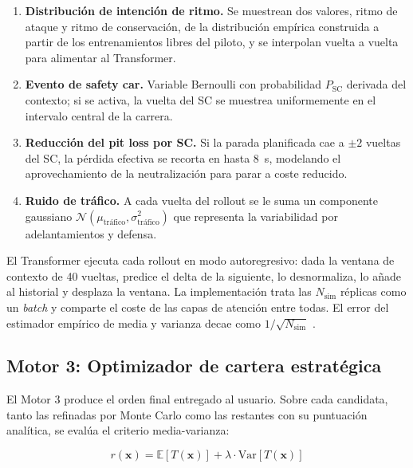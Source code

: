 \begin{enumerate}
    \item \textbf{Distribución de intención de ritmo.} Se muestrean dos valores, ritmo de ataque y ritmo de conservación, de la distribución empírica construida a partir de los entrenamientos libres del piloto, y se interpolan vuelta a vuelta para alimentar al Transformer.

    \item \textbf{Evento de safety car.} Variable Bernoulli con probabilidad $P_\text{SC}$ derivada del contexto; si se activa, la vuelta del SC se muestrea uniformemente en el intervalo central de la carrera.

    \item \textbf{Reducción del pit loss por SC.} Si la parada planificada cae a $\pm 2$ vueltas del SC, la pérdida efectiva se recorta en hasta 8~s, modelando el aprovechamiento de la neutralización para parar a coste reducido.

    \item \textbf{Ruido de tráfico.} A cada vuelta del rollout se le suma un componente gaussiano $\mathcal{N}(\mu_\text{tráfico}, \sigma_\text{tráfico}^2)$ que representa la variabilidad por adelantamientos y defensa.
\end{enumerate}

El Transformer ejecuta cada rollout en modo autoregresivo: dada la ventana de contexto de 40 vueltas, predice el delta de la siguiente, lo desnormaliza, lo añade al historial y desplaza la ventana. La implementación trata las $N_\text{sim}$ réplicas como un \textit{batch} y comparte el coste de las capas de atención entre todas. El error del estimador empírico de media y varianza decae como $1/\sqrt{N_\text{sim}}$ \cite{rubinstein2016monte}.

\subsection{Motor 3: Optimizador de cartera estratégica}
\label{ssec:motor3}

El Motor 3 produce el orden final entregado al usuario. Sobre cada candidata, tanto las refinadas por Monte Carlo como las restantes con su puntuación analítica, se evalúa el criterio media-varianza:

\begin{equation}
    r(\mathbf{x}) = \mathbb{E}[T(\mathbf{x})] + \lambda \cdot \mathrm{Var}[T(\mathbf{x})]
    \label{eq:risk_score_cap4}
\end{equation}

